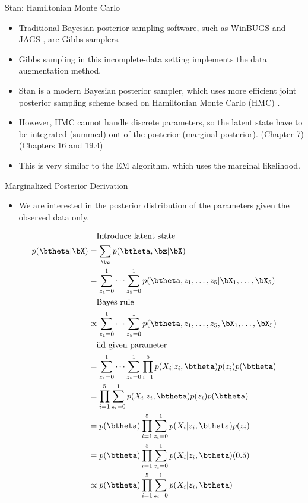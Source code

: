 \documentclass[dvipdfmx,bigger,aspectratio=169]{beamer}
\begin{document}
\begin{frame}[label={sec:orgc1a264f}]{Stan: Hamiltonian Monte Carlo}
\begin{itemize}
\item Traditional Bayesian posterior sampling software, such as WinBUGS \cite{lunnWinBUGSBayesianModelling2000} and JAGS \cite{plummerJAGSProgramAnalysis2003}, are Gibbs samplers.
\item Gibbs sampling in this incomplete-data setting implements the data augmentation method.
\item Stan \cite{carpenterStanProbabilisticProgramming2017} is a modern Bayesian posterior sampler, which uses more efficient joint posterior sampling scheme based on Hamiltonian Monte Carlo (HMC) \cite{betancourtConceptualIntroductionHamiltonian2017}.
\item However, HMC cannot handle discrete parameters, so the latent state have to be integrated (summed) out of the posterior (marginal posterior). \cite{standevelopmentteamStanUserGuide2019} (Chapter 7) \cite{lambertStudentGuideBayesian2018} (Chapters 16 and 19.4)
\item This is very similar to the EM algorithm, which uses the marginal likelihood.
\end{itemize}
\end{frame}

\begin{frame}[allowframebreaks,label=,t]{Marginalized Posterior Derivation}
\begin{itemize}
\item We are interested in the posterior distribution of the parameters given the observed data only.
\end{itemize}
\begin{align*}
  &~~~\text{Introduce latent state}\\
  p(\btheta | \bX)
  &= \sum_{\bz} p(\btheta, \bz | \bX)\\
  &= \sum^{1}_{z_{1}=0}\dots\sum^{1}_{z_{5}=0} p(\btheta, z_{1},\dots,z_{5} | \bX_{1},\dots,\bX_{5})\\
  &~~~\text{Bayes rule}\\
  &\propto \sum^{1}_{z_{1}=0}\dots\sum^{1}_{z_{5}=0} p(\btheta, z_{1},\dots,z_{5}, \bX_{1},\dots,\bX_{5})\\
  &~~~\text{iid given parameter}\\
  &= \sum^{1}_{z_{1}=0}\dots\sum^{1}_{z_{5}=0} \prod^{5}_{i=1}p(X_{i} | z_{i},\btheta) p(z_{i}) p(\btheta)\\
  &= \prod^{5}_{i=1} \sum^{1}_{z_{i}=0} p(X_{i} | z_{i},\btheta) p(z_{i}) p(\btheta)\\
  &= p(\btheta) \prod^{5}_{i=1} \sum^{1}_{z_{i}=0} p(X_{i} | z_{i},\btheta) p(z_{i})\\
  &= p(\btheta) \prod^{5}_{i=1} \sum^{1}_{z_{i}=0} p(X_{i} | z_{i}, \btheta) (0.5)\\
  &\propto p(\btheta) \prod^{5}_{i=1} \sum^{1}_{z_{i}=0} p(X_{i} | z_{i}, \btheta)
\end{align*}
\end{frame}
\end{document}
